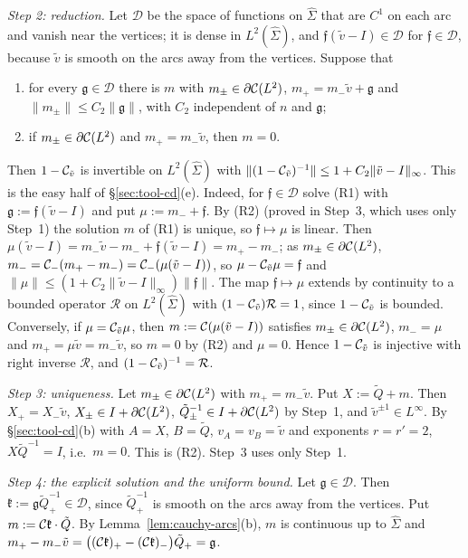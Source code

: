 \emph{Step 2: reduction.} Let $\mathcal D$ be the space of functions on $\hat\Sigma$ that are $C^1$ on each arc and vanish
near the vertices; it is dense in $L^2(\hat\Sigma)$, and $\mathfrak f(\tilde v-I)\in\mathcal D$ for $\mathfrak f\in\mathcal D$,
because $\tilde v$ is smooth on the arcs away from the vertices. Suppose that
\begin{enumerate}
\item[(R1)] for every $\mathfrak g\in\mathcal D$ there is $m$ with $m_\pm\in\partial\mathcal{C}(L^2)$, $m_+=m_-\tilde v+\mathfrak g$ and
  $\|m_\pm\|\le C_2\|\mathfrak g\|$, with $C_2$ independent of $n$ and $\mathfrak g$;
\item[(R2)] if $m_\pm\in\partial\mathcal{C}(L^2)$ and $m_+=m_-\tilde v$, then $m=0$.
\end{enumerate}
Then $1-\mathcal{C}_{\tilde v}$ is invertible on $L^2(\hat\Sigma)$ with $\|(1-\mathcal{C}_{\tilde v})^{-1}\|\le1+C_2\|\tilde v-I\|_\infty$.
This is the easy half of \S\ref{sec:tool-cd}(e). Indeed, for $\mathfrak f\in\mathcal D$ solve (R1) with $\mathfrak g:=\mathfrak f(\tilde
v-I)$ and put $\mu:=m_-+\mathfrak f$. By (R2) (proved in Step~3, which uses only Step~1) the
solution $m$ of (R1) is unique, so $\mathfrak f\mapsto\mu$ is linear. Then $\mu(\tilde v-I)=m_-\tilde v-m_-+\mathfrak f(\tilde v-I)=m_+-m_-$; as $m_\pm\in\partial\mathcal{C}(L^2)$,
$m_-=\mathcal{C}_-(m_+-m_-)=\mathcal{C}_-(\mu(\tilde v-I))$, so $\mu-\mathcal{C}_{\tilde v}\mu=\mathfrak f$ and $\|\mu\|\le
(1+C_2\|\tilde v-I\|_\infty)\|\mathfrak f\|$. The map $\mathfrak f\mapsto\mu$ extends by continuity to a bounded operator $\mathcal R$
on $L^2(\hat\Sigma)$ with $(1-\mathcal{C}_{\tilde v})\mathcal R=1$, since $1-\mathcal{C}_{\tilde v}$ is bounded. Conversely, if
$\mu=\mathcal{C}_{\tilde v}\mu$, then $m:=\mathcal{C}(\mu(\tilde v-I))$ satisfies $m_\pm\in\partial\mathcal{C}(L^2)$, $m_-=\mu$ and $m_+=\mu\tilde v=m_-\tilde
v$, so $m=0$ by (R2) and $\mu=0$. Hence $1-\mathcal{C}_{\tilde v}$ is injective with right inverse $\mathcal R$, and
$(1-\mathcal{C}_{\tilde v})^{-1}=\mathcal R$.

\emph{Step 3: uniqueness.} Let $m_\pm\in\partial\mathcal{C}(L^2)$ with $m_+=m_-\tilde v$. Put $X:=\tilde Q+m$. Then $X_+=X_-\tilde v$,
$X_\pm\in I+\partial\mathcal{C}(L^2)$, $\tilde Q_\pm^{-1}\in I+\partial\mathcal{C}(L^2)$ by Step~1, and $\tilde v^{\pm1}\in L^\infty$. By \S\ref{sec:tool-cd}(b) with
$A=X$, $B=\tilde Q$, $v_A=v_B=\tilde v$ and exponents $r=r'=2$, $X\tilde Q^{-1}=I$, i.e.\ $m=0$. This is (R2). Step~3 uses
only Step~1.

\emph{Step 4: the explicit solution and the uniform bound.} Let $\mathfrak g\in\mathcal D$. Then $\mathfrak k:=\mathfrak
g\tilde Q_+^{-1}\in\mathcal D$, since $\tilde Q_+^{-1}$ is smooth on the arcs away from the vertices. Put $m:=\mathcal{C}\mathfrak
k\cdot\tilde Q$. By Lemma~\ref{lem:cauchy-arcs}(b), $m$ is continuous up to $\hat\Sigma$ and
$m_+-m_-\tilde v=\bigl((\mathcal{C}\mathfrak k)_+-(\mathcal{C}\mathfrak k)_-\bigr)\tilde Q_+=\mathfrak g$.

